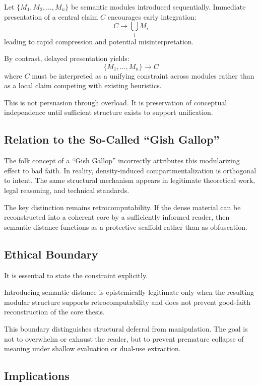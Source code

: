 Let $\{M_1, M_2, \ldots, M_n\}$ be semantic modules introduced sequentially. Immediate presentation of a central claim $C$ encourages early integration:
\[
C \rightarrow \bigcup_i M_i
\]
leading to rapid compression and potential misinterpretation.

By contrast, delayed presentation yields:
\[
\{M_1, \ldots, M_n\} \rightarrow C
\]
where $C$ must be interpreted as a unifying constraint across modules rather than as a local claim competing with existing heuristics.

This is not persuasion through overload. It is preservation of conceptual independence until sufficient structure exists to support unification.

\subsection{Relation to the So-Called ``Gish Gallop''}

The folk concept of a ``Gish Gallop'' incorrectly attributes this modularizing effect to bad faith. In reality, density-induced compartmentalization is orthogonal to intent. The same structural mechanism appears in legitimate theoretical work, legal reasoning, and technical standards.

The key distinction remains retrocomputability. If the dense material can be reconstructed into a coherent core by a sufficiently informed reader, then semantic distance functions as a protective scaffold rather than as obfuscation.

\subsection{Ethical Boundary}

It is essential to state the constraint explicitly.

\begin{proposition}
Introducing semantic distance is epistemically legitimate only when the resulting modular structure supports retrocomputability and does not prevent good-faith reconstruction of the core thesis.
\end{proposition}

This boundary distinguishes structural deferral from manipulation. The goal is not to overwhelm or exhaust the reader, but to prevent premature collapse of meaning under shallow evaluation or dual-use extraction.

\subsection{Implications}


